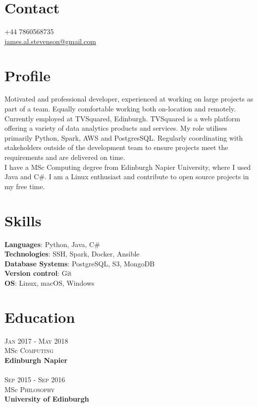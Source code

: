 \documentclass[14pt, a4paper]{extarticle}
\begin{document}
\par{\bigskip\par
\section{Contact}
\large
+44 7860568735\\
\href{mailto:james.al.stevenson@gmail.com}{james.al.stevenson@gmail.com}\\
}

\begin{multicols}{2}

\section{Profile}
\noindent Motivated and professional developer, experienced at working on large projects as part of a team. Equally comfortable working both on-location and remotely.\\
Currently employed at TVSquared, Edinburgh. TVSquared is a web platform offering a variety of data analytics products and services. My role utilises primarily Python, Spark, AWS and PostgresSQL. Regularly coordinating with stakeholders outside of the development team to ensure projects meet the requirements and are delivered on time.\\
I have a MSc Computing degree from Edinburgh Napier University, where I used Java and C\#. I am a Linux enthusiast and contribute to open source projects in my free time.

\section{Skills}
\noindent\textbf{Languages}: Python, Java, C\#\\
\textbf{Technologies}: SSH, Spark, Docker, Ansible\\
\textbf{Database Systems}: PostgreSQL, S3, MongoDB\\
\textbf{Version control}: Git\\
\textbf{OS}: Linux, macOS, Windows

\section{Education}
\noindent\textsc{Jan} 2017 - \textsc{May} 2018\\
MSc \textsc{Computing} \\
\textbf{Edinburgh Napier}\\~\\
\textsc{Sep} 2015 - \textsc{Sep} 2016\\
MSc \textsc{Philosophy} \\
\textbf{University of Edinburgh}


\end{multicols}
\end{document}
